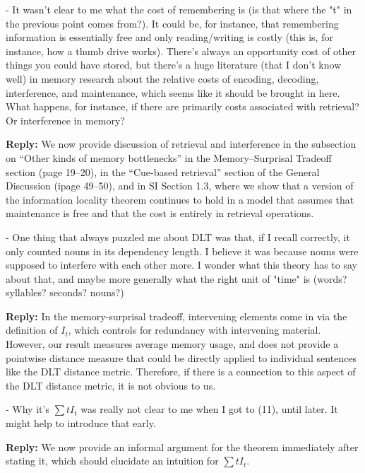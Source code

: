 \documentclass{article}[11pt,a4paper,oneside]
\newenvironment{reply}
  {\par\medskip
   \color{blue}%
   \begin{framed}
   \textbf{Reply: }\ignorespaces}
 {\end{framed}
  \medskip}
\begin{document}
- It wasn't clear to me what the cost of remembering is (is that where the "t" in the previous point comes from?). It could be, for instance, that remembering information is essentially free and only reading/writing is costly (this is, for instance, how a thumb drive works). There's always an opportunity cost of other things you could have stored, but there's a huge literature (that I don't know well) in memory research about the relative costs of encoding, decoding, interference, and maintenance, which seems like it should be brought in here. What happens, for instance, if there are primarily costs associated with retrieval? Or interference in memory?

\begin{reply}
	We now provide discussion of retrieval and interference in the subsection on ``Other kinds of memory bottlenecks'' in the Memory--Surprisal Tradeoff section (page 19--20), in the ``Cue-based retrieval'' section of the General Discussion (ipage 49--50), and in SI Section 1.3, where we show that a version of the information locality theorem continues to hold in a model that assumes that maintenance is free and that the cost is entirely in retrieval operations.
\end{reply}

- One thing that always puzzled me about DLT was that, if I recall correctly, it only counted nouns in its dependency length. I believe it was because nouns were supposed to interfere with each other more. I wonder what this theory has to say about that, and maybe more generally what the right unit of "time" is (words? syllables? seconds? nouns?)

\begin{reply}
In the memory-surprisal tradeoff, intervening elements come in via the definition of $I_t$, which controls for redundancy with intervening material.
However, our result measures average memory usage, and does not provide a pointwise distance measure that could be directly applied to individual sentences like the DLT distance metric.
Therefore, if there is a connection to this aspect of the DLT distance metric, it is not obvious to us.
\end{reply}

- Why it's $\sum t I_t$ was really not clear to me when I got to (11), until later. It might help to introduce that early.

\begin{reply}
We now provide an informal argument for the theorem immediately after stating it, which should elucidate an intuition for $\sum t I_t$.
\end{reply}
\end{document}
